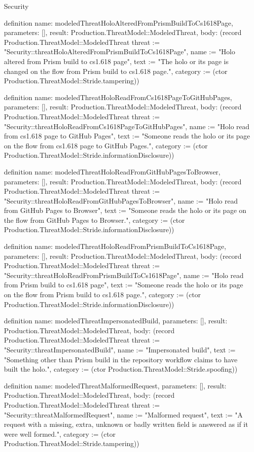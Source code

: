 \begin{lexlean}{Security}
\begin{semanticmodule}
definition{
  name: modeledThreatHoloAlteredFromPrismBuildToCs1618Page,
  parameters: [],
  result: Production.ThreatModel::ModeledThreat,
  body: (record Production.ThreatModel::ModeledThreat {threat := "Security::threatHoloAlteredFromPrismBuildToCs1618Page", name := "Holo altered from Prism build to cs1.618 page", text := "The holo or its page is changed on the flow from Prism build to cs1.618 page.", category := (ctor Production.ThreatModel::Stride.tampering)})
}

definition{
  name: modeledThreatHoloReadFromCs1618PageToGitHubPages,
  parameters: [],
  result: Production.ThreatModel::ModeledThreat,
  body: (record Production.ThreatModel::ModeledThreat {threat := "Security::threatHoloReadFromCs1618PageToGitHubPages", name := "Holo read from cs1.618 page to GitHub Pages", text := "Someone reads the holo or its page on the flow from cs1.618 page to GitHub Pages.", category := (ctor Production.ThreatModel::Stride.informationDisclosure)})
}

definition{
  name: modeledThreatHoloReadFromGitHubPagesToBrowser,
  parameters: [],
  result: Production.ThreatModel::ModeledThreat,
  body: (record Production.ThreatModel::ModeledThreat {threat := "Security::threatHoloReadFromGitHubPagesToBrowser", name := "Holo read from GitHub Pages to Browser", text := "Someone reads the holo or its page on the flow from GitHub Pages to Browser.", category := (ctor Production.ThreatModel::Stride.informationDisclosure)})
}

definition{
  name: modeledThreatHoloReadFromPrismBuildToCs1618Page,
  parameters: [],
  result: Production.ThreatModel::ModeledThreat,
  body: (record Production.ThreatModel::ModeledThreat {threat := "Security::threatHoloReadFromPrismBuildToCs1618Page", name := "Holo read from Prism build to cs1.618 page", text := "Someone reads the holo or its page on the flow from Prism build to cs1.618 page.", category := (ctor Production.ThreatModel::Stride.informationDisclosure)})
}

definition{
  name: modeledThreatImpersonatedBuild,
  parameters: [],
  result: Production.ThreatModel::ModeledThreat,
  body: (record Production.ThreatModel::ModeledThreat {threat := "Security::threatImpersonatedBuild", name := "Impersonated build", text := "Something other than Prism build in the repository workflow claims to have built the holo.", category := (ctor Production.ThreatModel::Stride.spoofing)})
}

definition{
  name: modeledThreatMalformedRequest,
  parameters: [],
  result: Production.ThreatModel::ModeledThreat,
  body: (record Production.ThreatModel::ModeledThreat {threat := "Security::threatMalformedRequest", name := "Malformed request", text := "A request with a missing, extra, unknown or badly written field is answered as if it were well formed.", category := (ctor Production.ThreatModel::Stride.tampering)})
}


\end{semanticmodule}
\end{lexlean}

